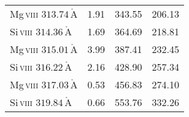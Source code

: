 \begin{tabular}{l|r|r|r}
 Mg\,\textsc{viii} $313.74\,$$\mathrm{\mathring{A}}$ &                     1.91 &               343.55 &               206.13 \\
 Si\,\textsc{viii} $314.36\,$$\mathrm{\mathring{A}}$ &                     1.69 &               364.69 &               218.81 \\
 Mg\,\textsc{viii} $315.01\,$$\mathrm{\mathring{A}}$ &                     3.99 &               387.41 &               232.45 \\
 Si\,\textsc{viii} $316.22\,$$\mathrm{\mathring{A}}$ &                     2.16 &               428.90 &               257.34 \\
 Mg\,\textsc{viii} $317.03\,$$\mathrm{\mathring{A}}$ &                     0.53 &               456.83 &               274.10 \\
 Si\,\textsc{viii} $319.84\,$$\mathrm{\mathring{A}}$ &                     0.66 &               553.76 &               332.26 \\
\bottomrule
\end{tabular}
